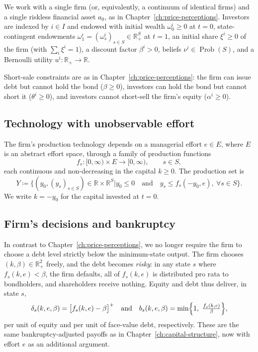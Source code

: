 \documentclass[11pt,a4paper,oneside]{book}
\def\R{\mathbb{R}}
\def\leq{\leqslant}
\def\geq{\geqslant}
\def\et{\quad \text{and} \quad}
\DeclareMathOperator{\Prob}{Prob}
\theoremstyle{plain}
\theoremstyle{definition}
\theoremstyle{remark}
\numberwithin{equation}{chapter}
\begin{document}
We work with a single firm (or, equivalently, a continuum of identical firms) and a single riskless financial asset $a_0$, as in Chapter~\ref{ch:price-perceptions}.
Investors are indexed by $i \in I$ and endowed with initial wealth $\omega^i_0 \geq 0$ at $t=0$, state-contingent endowments $\omega^i_1 = (\omega^i_s)_{s \in S} \in \R_+^S$ at $t=1$, an initial share $\xi^i \geq 0$ of the firm (with $\sum_i \xi^i = 1$), a discount factor $\beta^i > 0$, beliefs $\nu^i \in \Prob(S)$, and a Bernoulli utility $u^i : \R_+ \to \R$.

Short-sale constraints are as in Chapter~\ref{ch:price-perceptions}: the firm can issue debt but cannot hold the bond ($\beta \geq 0$), investors can hold the bond but cannot short it ($\theta^i \geq 0$), and investors cannot short-sell the firm's equity ($\alpha^i \geq 0$).

\subsection{Technology with unobservable effort}

The firm's production technology depends on a managerial effort $e \in E$, where $E$ is an abstract effort space, through a family of production functions
\begin{equation*}
  f_s : [0, \infty) \times E \to [0, \infty),
  \qquad s \in S,
\end{equation*}
each continuous and non-decreasing in the capital $k \geq 0$.
The production set is
\begin{equation*}
  Y \coloneqq \bigl\{ (y_0, (y_s)_{s \in S}) \in \R \times \R^S \vert y_0 \leq 0 \et y_s \leq f_s(-y_0, e), \ \forall s \in S \bigr\}.
\end{equation*}
We write $k = -y_0$ for the capital invested at $t=0$.

\subsection{Firm's decisions and bankruptcy}

In contrast to Chapter~\ref{ch:price-perceptions}, we no longer require the firm to choose a debt level strictly below the minimum-state output.
The firm chooses $(k, \beta) \in \R_+^2$ freely, and the debt becomes \emph{risky}: in any state $s$ where $f_s(k, e) < \beta$, the firm defaults, all of $f_s(k, e)$ is distributed pro rata to bondholders, and shareholders receive nothing.
Equity and debt thus deliver, in state $s$,
\begin{equation}\label{eq:div-debt-MH}
  \delta_s(k, e, \beta) = \bigl[ f_s(k, e) - \beta \bigr]^+
  \et
  b_s(k, e, \beta) = \min\Bigl\{ 1, \ \tfrac{f_s(k, e)}{\beta} \Bigr\},
\end{equation}
per unit of equity and per unit of face-value debt, respectively.
These are the same bankruptcy-adjusted payoffs as in Chapter~\ref{ch:capital-structure}, now with effort $e$ as an additional argument.
\end{document}
